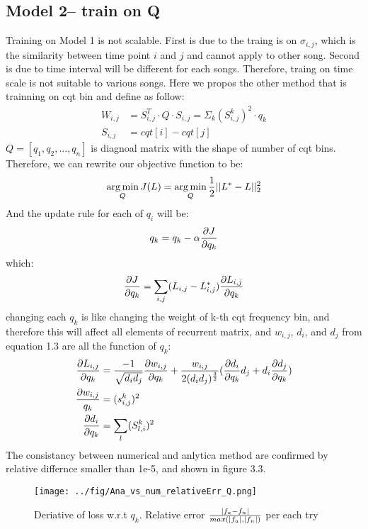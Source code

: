 \documentclass[final]{siamltexmm}
\DeclareMathOperator*{\argmin}{arg\,min} %
\begin{document}
\subsection{Model 2-- train on Q}
Training on Model 1 is not scalable. First is due to the traing is on $\sigma_{i,j}$, which is the similarity between time point $i$ and $j$ and cannot apply to other song. Second is due to time interval will be different for each songs. Therefore, traing on time scale is not suitable to various songs. Here we propos the other method that is trainning on cqt bin and define as follow:
\begin{equation}
\begin{aligned}
W_{i,j} &= S^T_{i,j} \cdot Q \cdot S_{i,j} = \Sigma_k (S^k_{i,j})^2 \cdot q_{k}\\
S_{i,j} &= cqt[i] - cqt[j]
\end{aligned}
\end{equation}
$Q = [q_1, q_2, ..., q_n]$ is diagnoal matrix with the shape of number of cqt bins. Therefore, we can rewrite our objective function to be:
\begin{equation}
\begin{aligned}
\argmin_Q J(L) = \argmin_Q {1\over 2}||L^{\ast} - L||^2_2
\end{aligned}
\end{equation}
And the update rule for each of $q_i$ will be:
\begin{equation}
\begin{aligned}
q_k = q_k - \alpha {\partial J \over \partial q_k}
\end{aligned}
\end{equation}
which:
\begin{equation}
\begin{aligned}
{\partial J \over \partial q_k} = \sum_{\substack{i,j}} (L_{i,j} - L_{i,j}^{\ast}) {\partial L_{i,j} \over \partial q_k}
\end{aligned}
\end{equation}
changing each $q_k$ is like changing the weight of k-th cqt frequency bin, and therefore this will affect all elements of recurrent matrix, and $w_{i,j}$, $d_i$, and $d_j$ from equation 1.3 are all the function of $q_k$:
\begin{equation}
\begin{aligned}
{\partial L_{i,j} \over \partial q_k} &= {-1 \over \sqrt{d_id_j}} {\partial w_{i,j}\over \partial q_k} + {w_{i,j} \over 2(d_id_j)^{3\over2}}({\partial d_i\over \partial q_k}d_j + d_i{\partial d_j\over \partial q_k})\\
{\partial w_{i,j} \over q_k} &= (s_{i,j}^k)^2 \\
{\partial d_i \over \partial q_k} &= \sum_{\substack{l}} (S_{l,i}^k)^2
\end{aligned}
\end{equation}
The consistancy between numerical and anlytica method are confirmed by relative differnce smaller than 1e-5, and shown in figure 3.3.
\begin{figure}[H]
  \centering
    \texttt{[image: ../fig/Ana\_vs\_num\_relativeErr\_Q.png]}
  \caption{Deriative of loss w.r.t $q_k$. Relative error $|f_a - f_n| \over max(|f_a|, |f_n|)$ per each try}
\end{figure}
\end{document}
